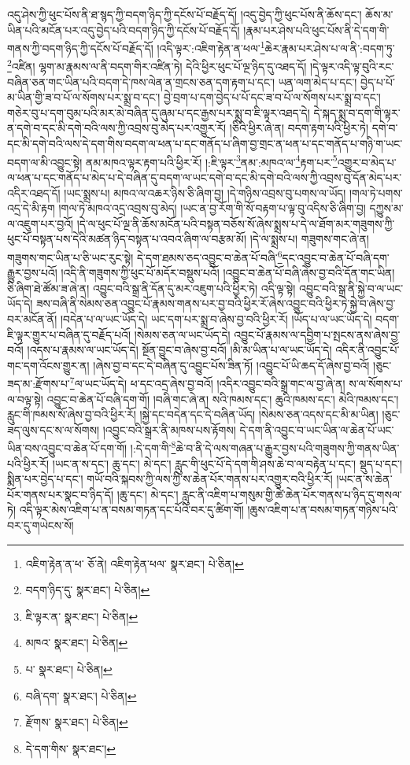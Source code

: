འདུ་ཤེས་ཀྱི་ཕུང་པོས་ནི་ཐ་སྙད་ཀྱི་བདག་ཉིད་ཀྱི་དངོས་པོ་བརྗོད་དོ། །འདུ་བྱེད་ཀྱི་ཕུང་པོས་ནི་ཆོས་དང་། ཆོས་མ་ཡིན་པའི་མངོན་པར་འདུ་བྱེད་པའི་བདག་ཉིད་ཀྱི་དངོས་པོ་བརྗོད་དོ། །རྣམ་པར་ཤེས་པའི་ཕུང་པོས་ནི་དེ་དག་གི་གནས་ཀྱི་བདག་ཉིད་ཀྱི་དངོས་པོ་བརྗོད་དོ། །འདི་ལྟར་:འཇིག་རྟེན་ན་ཕལ་\footnote{འཇིག་རྟེན་ན་ཕ་  ཅོ་ནེ། འཇིག་རྟེན་ཕལ་  སྣར་ཐང་།  པེ་ཅིན། }ཆེར་རྣམ་པར་ཤེས་པ་ལ་ནི་:བདག་ཏུ་\footnote{བདག་ཉིད་དུ་  སྣར་ཐང་།  པེ་ཅིན། }འཛིན། ལྷག་མ་རྣམས་ལ་ནི་བདག་གིར་འཛིན་ཏེ། དེའི་ཕྱིར་ཕུང་པོ་ལྔ་ཉིད་དུ་འཐད་དོ། །དེ་ལྟར་འདི་ལྟ་བུའི་རང་བཞིན་ཅན་གང་ཡིན་པའི་བདག་དེ་ཁས་ལེན་ན་གྲངས་ཅན་དག་རྟག་པ་དང་། ཡན་ལག་མེད་པ་དང་། བྱེད་པ་པོ་མ་ཡིན་གྱི་ཟ་བ་པོ་ལ་སོགས་པར་སྨྲ་བ་དང་། བྱེ་བྲག་པ་དག་བྱེད་པ་པོ་དང་ཟ་བ་པོ་ལ་སོགས་པར་སྨྲ་བ་དང་། གཅེར་བུ་པ་དག་བུམ་པའི་མར་མེ་བཞིན་དུ་ཞུམ་པ་དང་རྒྱས་པར་སྨྲ་བ་ཇི་ལྟར་འཐད་དེ། དེ་སྐད་སྨྲ་བ་དག་གི་ལྟར་ན་དགེ་བ་དང་མི་དགེ་བའི་ལས་ཀྱི་འབྲས་བུ་མེད་པར་འགྱུར་རོ། །ཅིའི་ཕྱིར་ཞེ་ན། བདག་རྟག་པའི་ཕྱིར་ཏེ། དགེ་བ་དང་མི་དགེ་བའི་ལས་དེ་དག་གིས་བདག་ལ་ཕན་པ་དང་གནོད་པ་ཞིག་བྱ་གྲང་ན་ཕན་པ་དང་གནོད་པ་གཉི་ག་ཡང་བདག་ལ་མི་འབྱུང་སྟེ། ནམ་མཁའ་ལྟར་རྟག་པའི་ཕྱིར་རོ། །:ཇི་ལྟར་\footnote{ཇི་ལྟར་ན་  སྣར་ཐང་།  པེ་ཅིན། }ནམ་:མཁའ་ལ་\footnote{མཁའ་  སྣར་ཐང་།  པེ་ཅིན། }རྟག་པར་\footnote{པ་  སྣར་ཐང་།  པེ་ཅིན། }འགྱུར་བ་མེད་པ་ལ་ཕན་པ་དང་གནོད་པ་མེད་པ་དེ་བཞིན་དུ་བདག་ལ་ཡང་དགེ་བ་དང་མི་དགེ་བའི་ལས་ཀྱི་འབྲས་བུ་དོན་མེད་པར་འདིར་འཐད་དོ། །ཡང་སྨྲས་པ། མཁའ་ལ་འཆར་ཉིས་ཅི་ཞིག་བྱ། །དེ་གཉིས་འབྲས་བུ་པགས་ལ་ཡོད། །གལ་ཏེ་པགས་འདྲ་དེ་མི་རྟག །གལ་ཏེ་མཁའ་འདྲ་འབྲས་བུ་མེད། །ཡང་ན་བྱ་རོག་གི་སོ་བརྟག་པ་ལྟ་བུ་འདིས་ཅི་ཞིག་བྱ། དཀྱུས་མ་ལ་འཇུག་པར་བྱའོ། །དེ་ལ་ཕུང་པོ་ལྔ་ནི་ཆོས་མངོན་པའི་བསྟན་བཅོས་སོ་ཞེས་སྨྲས་པ་དེ་ལ་ཐོག་མར་གཟུགས་ཀྱི་ཕུང་པོ་བསྟན་པས་དེའི་མཚན་ཉིད་བསྟན་པ་འབའ་ཞིག་ལ་བརྩམ་མོ། །དེ་ལ་སྨྲས་པ། གཟུགས་གང་ཞེ་ན། གཟུགས་གང་ཡིན་པ་ཅི་ཡང་རུང་སྟེ། དེ་དག་ཐམས་ཅད་འབྱུང་བ་ཆེན་པོ་བཞི་\footnote{བཞི་དག་  སྣར་ཐང་།  པེ་ཅིན། }དང་འབྱུང་བ་ཆེན་པོ་བཞི་དག་རྒྱུར་བྱས་པའོ། །འདི་ནི་གཟུགས་ཀྱི་ཕུང་པོ་མདོར་བསྡུས་པའོ། །འབྱུང་བ་ཆེན་པོ་བཞི་ཞེས་བྱ་བའི་དོན་གང་ཡིན། ཅི་ཞིག་ཐེ་ཚོམ་ཟ་ཞེ་ན། འབྱུང་བའི་སྒྲ་ནི་དོན་དུ་མར་འཇུག་པའི་ཕྱིར་ཏེ། འདི་ལྟ་སྟེ། འབྱུང་བའི་སྒྲ་ནི་སྐྱེ་བ་ལ་ཡང་ཡོད་དེ། ཟས་བཞི་ནི་སེམས་ཅན་འབྱུང་པོ་རྣམས་གནས་པར་བྱ་བའི་ཕྱིར་རོ་ཞེས་འབྱུང་བའི་ཕྱིར་ཏེ་སྐྱེ་བ་ཞེས་བྱ་བར་མངོན་ནོ། །བདེན་པ་ལ་ཡང་ཡོད་དེ། ཡང་དག་པར་སྨྲ་བ་ཞེས་བྱ་བའི་ཕྱིར་རོ། །ཡོད་པ་ལ་ཡང་ཡོད་དེ། བདག་ཇི་ལྟར་གྱུར་པ་བཞིན་དུ་བརྗོད་པའོ། །སེམས་ཅན་ལ་ཡང་ཡོད་དེ། འབྱུང་པོ་རྣམས་ལ་དབྱིག་པ་སྤངས་ནས་ཞེས་བྱ་བའོ། །འདས་པ་རྣམས་ལ་ཡང་ཡོད་དེ། སྔོན་བྱུང་བ་ཞེས་བྱ་བའོ། །མི་མ་ཡིན་པ་ལ་ཡང་ཡོད་དེ། འདིར་ནི་འབྱུང་པོ་གང་དག་འོངས་གྱུར་ན། །ཞེས་བྱ་བ་དང་དེ་བཞིན་དུ་འབྱུང་པོས་ཟིན་ཏོ། །འབྱུང་པོ་ཡི་ཆད་དོ་ཞེས་བྱ་བའོ། །ཅུང་ཟད་མ་:རྫོགས་པ་\footnote{རྫོགས་  སྣར་ཐང་།  པེ་ཅིན། }ལ་ཡང་ཡོད་དེ། ཕ་དང་འདྲ་ཞེས་བྱ་བའོ། །འདིར་འབྱུང་བའི་སྒྲ་གང་ལ་བྱ་ཞེ་ན། ས་ལ་སོགས་པ་ལ་བལྟ་སྟེ། འབྱུང་བ་ཆེན་པོ་བཞི་དག་གོ། །བཞི་གང་ཞེ་ན། སའི་ཁམས་དང་། ཆུའི་ཁམས་དང་། མེའི་ཁམས་དང་། རླུང་གི་ཁམས་སོ་ཞེས་བྱ་བའི་ཕྱིར་རོ། །སྐྱེ་དང་བདེན་དང་དེ་བཞིན་ཡོད། །སེམས་ཅན་འདས་དང་མི་མ་ཡིན། །ཅུང་ཟད་ལུས་དང་ས་ལ་སོགས། །འབྱུང་བའི་སྒྲར་ནི་མཁས་པས་རྟོགས། དེ་དག་ནི་འབྱུང་བ་ཡང་ཡིན་ལ་ཆེན་པོ་ཡང་ཡིན་བས་འབྱུང་བ་ཆེན་པོ་དག་གོ། །:དེ་དག་གི་\footnote{དེ་དག་གིས་  སྣར་ཐང་། }ཆེ་བ་ནི་དེ་ལས་གཞན་པ་རྒྱུར་བྱས་པའི་གཟུགས་ཀྱི་གནས་ཡིན་པའི་ཕྱིར་རོ། །ཡང་ན་ས་དང་། ཆུ་དང་། མེ་དང་། རླུང་གི་ཕུང་པོ་དེ་དག་གི་ཤས་ཆེ་བ་ལ་བརྟེན་པ་དང་། སྡུད་པ་དང་། སྨིན་པར་བྱེད་པ་དང་། གཡོ་བའི་སྐབས་ཀྱི་ལས་ཀྱི་ས་ཆེན་པོར་གནས་པར་འགྱུར་བའི་ཕྱིར་རོ། །ཡང་ན་ས་ཆེན་པོར་གནས་པར་སྣང་བ་ཉིད་དོ། །ཆུ་དང་། མེ་དང་། རླུང་ནི་འཇིག་པ་གསུམ་གྱི་ཚེ་ཆེན་པོར་གནས་པ་ཉིད་དུ་གསལ་ཏེ། འདི་ལྟར་མེས་འཇིག་པ་ན་བསམ་གཏན་དང་པོའི་བར་དུ་ཚིག་གོ། །ཆུས་འཇིག་པ་ན་བསམ་གཏན་གཉིས་པའི་བར་དུ་གཡེངས་སོ། 